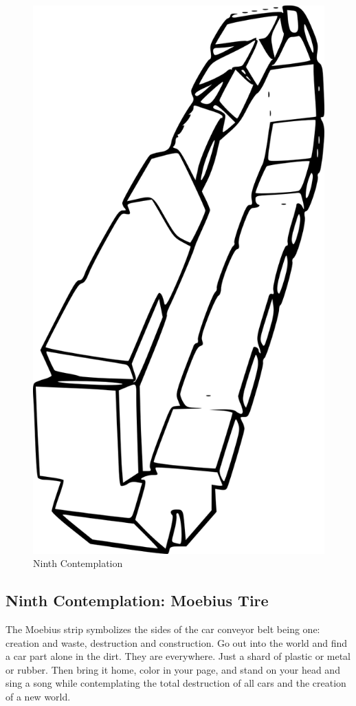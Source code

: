 \begin{figure}[htbp]
\centering
\includegraphics{images/contemplations/contemplation9C.png}
\caption{Ninth Contemplation}
\end{figure}

\subsection{Ninth Contemplation: Moebius
Tire}\label{ninth-contemplation-moebius-tire}

The Moebius strip symbolizes the sides of the car conveyor belt being
one: creation and waste, destruction and construction. Go out into the
world and find a car part alone in the dirt. They are everywhere. Just a
shard of plastic or metal or rubber. Then bring it home, color in your
page, and stand on your head and sing a song while contemplating the
total destruction of all cars and the creation of a new world.
